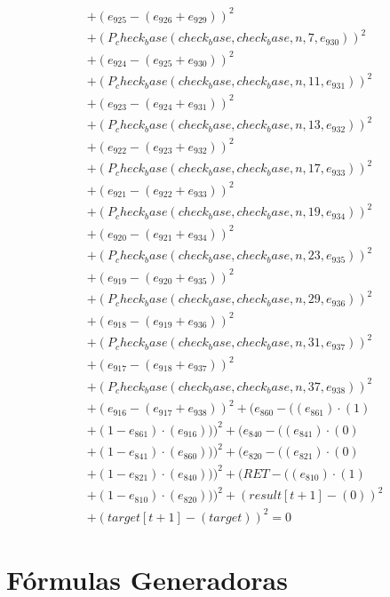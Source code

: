 \documentclass[10pt, a4paper]{article}
\begin{document}
\begin{align*}
& + (e_{925} - (e_{926} + e_{929}))^{2} \\
& + (P_check_base(check_base, check_base, n, 7, e_{930}))^{2} \\
& + (e_{924} - (e_{925} + e_{930}))^{2} \\
& + (P_check_base(check_base, check_base, n, 11, e_{931}))^{2} \\
& + (e_{923} - (e_{924} + e_{931}))^{2} \\
& + (P_check_base(check_base, check_base, n, 13, e_{932}))^{2} \\
& + (e_{922} - (e_{923} + e_{932}))^{2} \\
& + (P_check_base(check_base, check_base, n, 17, e_{933}))^{2} \\
& + (e_{921} - (e_{922} + e_{933}))^{2} \\
& + (P_check_base(check_base, check_base, n, 19, e_{934}))^{2} \\
& + (e_{920} - (e_{921} + e_{934}))^{2} \\
& + (P_check_base(check_base, check_base, n, 23, e_{935}))^{2} \\
& + (e_{919} - (e_{920} + e_{935}))^{2} \\
& + (P_check_base(check_base, check_base, n, 29, e_{936}))^{2} \\
& + (e_{918} - (e_{919} + e_{936}))^{2} \\
& + (P_check_base(check_base, check_base, n, 31, e_{937}))^{2} \\
& + (e_{917} - (e_{918} + e_{937}))^{2} \\
& + (P_check_base(check_base, check_base, n, 37, e_{938}))^{2} \\
& + (e_{916} - (e_{917} + e_{938}))^{2} + (e_{860} - ((e_{861})  \cdot  (1) \\
& + (1 - e_{861})  \cdot  (e_{916})))^{2} + (e_{840} - ((e_{841})  \cdot  (0) \\
& + (1 - e_{841})  \cdot  (e_{860})))^{2} + (e_{820} - ((e_{821})  \cdot  (0) \\
& + (1 - e_{821})  \cdot  (e_{840})))^{2} + (RET - ((e_{810})  \cdot  (1) \\
& + (1 - e_{810})  \cdot  (e_{820})))^{2} + (result[t+1] - (0))^{2} \\
& + (target[t+1] - (target))^{2} = 0
\end{align*}\part{Fórmulas Generadoras}
\end{document}
